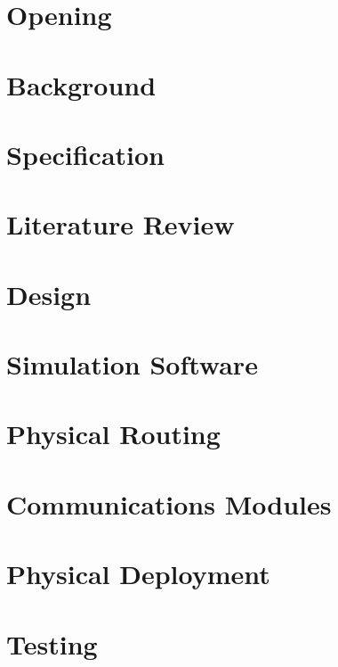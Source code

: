 \documentclass[10pt,a4paper,twoside]{report}
\begin{document}
\abstract{\lipsum[1]}

\begin{multicols}{2}

\chapter{Opening}
	

\chapter{Background}
	

\chapter{Specification}
	

\chapter{Literature Review}
		

\chapter{Design}
	

\chapter{Simulation Software}
	

\chapter{Physical Routing}
	

\chapter{Communications Modules}
	

\chapter{Physical Deployment}
	

\chapter{Testing}
	


\end{multicols}
\end{document}
